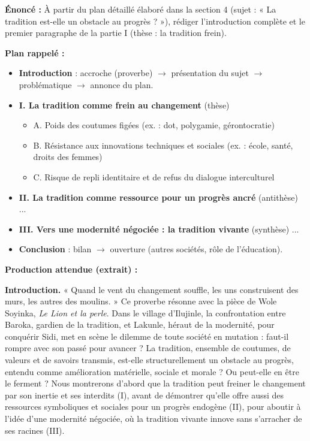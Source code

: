\documentclass[11pt]{article}
\begin{document}
\begin{exoresolu}
\textbf{Énoncé :} À partir du plan détaillé élaboré dans la section 4 (sujet : « La tradition est-elle un obstacle au progrès ? »), rédiger l'introduction complète et le premier paragraphe de la partie I (thèse : la tradition frein).

\textbf{Plan rappelé :}
\begin{itemize}
    \item \textbf{Introduction} : accroche (proverbe) $\rightarrow$ présentation du sujet $\rightarrow$ problématique $\rightarrow$ annonce du plan.
    \item \textbf{I. La tradition comme frein au changement} (thèse)
        \begin{itemize}
            \item A. Poids des coutumes figées (ex. : dot, polygamie, gérontocratie)
            \item B. Résistance aux innovations techniques et sociales (ex. : école, santé, droits des femmes)
            \item C. Risque de repli identitaire et de refus du dialogue interculturel
        \end{itemize}
    \item \textbf{II. La tradition comme ressource pour un progrès ancré} (antithèse) ...
    \item \textbf{III. Vers une modernité négociée : la tradition vivante} (synthèse) ...
    \item \textbf{Conclusion} : bilan $\rightarrow$ ouverture (autres sociétés, rôle de l'éducation).
\end{itemize}

\textbf{Production attendue (extrait) :}

\textbf{Introduction.} « Quand le vent du changement souffle, les uns construisent des murs, les autres des moulins. » Ce proverbe résonne avec la pièce de Wole Soyinka, \emph{Le Lion et la perle}. Dans le village d'Ilujinle, la confrontation entre Baroka, gardien de la tradition, et Lakunle, héraut de la modernité, pour conquérir Sidi, met en scène le dilemme de toute société en mutation : faut-il rompre avec son passé pour avancer ? La tradition, ensemble de coutumes, de valeurs et de savoirs transmis, est-elle structurellement un obstacle au progrès, entendu comme amélioration matérielle, sociale et morale ? Ou peut-elle en être le ferment ? Nous montrerons d'abord que la tradition peut freiner le changement par son inertie et ses interdits (I), avant de démontrer qu'elle offre aussi des ressources symboliques et sociales pour un progrès endogène (II), pour aboutir à l'idée d'une modernité négociée, où la tradition vivante innove sans s'arracher de ses racines (III).


\end{exoresolu}
\end{document}
